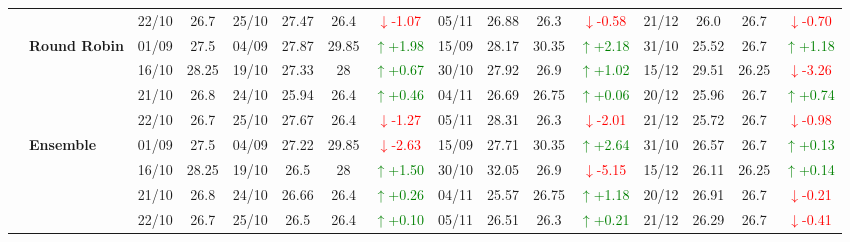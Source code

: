 {\begin{longtable}{llcc|cccc|cccc|cccc}
&
& 22/10 & 26.7 & 25/10 & 27.47 & 26.4 & \textcolor{red}{\(\downarrow\)-1.07} & 05/11 & 26.88 & 26.3 & \textcolor{red}{\(\downarrow\)-0.58} & 21/12 & 26.0 & 26.7 & \textcolor{red}{\(\downarrow\)-0.70} \\
\cmidrule(lr){2-16}


& \textbf{Round Robin}
& 01/09 & 27.5 & 04/09 & 27.87 & 29.85 & \textcolor{green}{\(\uparrow\)+1.98} & 15/09 & 28.17 & 30.35 & \textcolor{green}{\(\uparrow\)+2.18} & 31/10 & 25.52 & 26.7 & \textcolor{green}{\(\uparrow\)+1.18} \\

& 
& 16/10 & 28.25 & 19/10 & 27.33 & 28 & \textcolor{green}{\(\uparrow\)+0.67} & 30/10 & 27.92 & 26.9 & \textcolor{green}{\(\uparrow\)+1.02} & 15/12 & 29.51 & 26.25 & \textcolor{red}{\(\downarrow\)-3.26} \\

& 
& 21/10 & 26.8 & 24/10 & 25.94 & 26.4 & \textcolor{green}{\(\uparrow\)+0.46} & 04/11 & 26.69 & 26.75 & \textcolor{green}{\(\uparrow\)+0.06} & 20/12 & 25.96 & 26.7 & \textcolor{green}{\(\uparrow\)+0.74} \\

&
& 22/10 & 26.7 & 25/10 & 27.67 & 26.4 & \textcolor{red}{\(\downarrow\)-1.27} & 05/11 & 28.31 & 26.3 & \textcolor{red}{\(\downarrow\)-2.01} & 21/12 & 25.72 & 26.7 & \textcolor{red}{\(\downarrow\)-0.98} \\
\cmidrule(lr){2-16}


& \textbf{Ensemble}
& 01/09 & 27.5 & 04/09 & 27.22 & 29.85& \textcolor{red}{\(\downarrow\)-2.63} & 15/09 & 27.71 & 30.35 & \textcolor{green}{\(\uparrow\)+2.64} & 31/10 & 26.57 & 26.7 & \textcolor{green}{\(\uparrow\)+0.13} \\

& 
& 16/10 & 28.25 & 19/10 & 26.5 & 28 & \textcolor{green}{\(\uparrow\)+1.50} & 30/10 & 32.05 & 26.9 & \textcolor{red}{\(\downarrow\)-5.15} & 15/12 & 26.11 & 26.25 & \textcolor{green}{\(\uparrow\)+0.14} \\

& 
& 21/10 & 26.8 & 24/10 & 26.66 & 26.4 & \textcolor{green}{\(\uparrow\)+0.26} & 04/11 & 25.57 & 26.75 & \textcolor{green}{\(\uparrow\)+1.18} & 20/12 & 26.91 & 26.7 & \textcolor{red}{\(\downarrow\)-0.21} \\

&
& 22/10 & 26.7 & 25/10 & 26.5 & 26.4 & \textcolor{green}{\(\uparrow\)+0.10} & 05/11 & 26.51 & 26.3 & \textcolor{green}{\(\uparrow\)+0.21} & 21/12 & 26.29 & 26.7 & \textcolor{red}{\(\downarrow\)-0.41} \\
\midrule




\end{longtable}}
